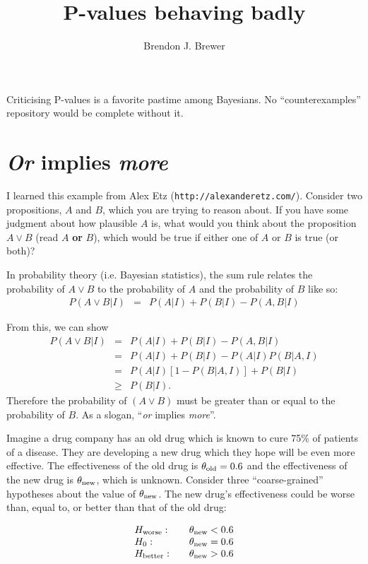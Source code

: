 \documentclass[a4paper, 12pt]{article}
\title{P-values behaving badly}
\author{Brendon J. Brewer}
\begin{document}
\maketitle

Criticising P-values is a favorite pastime among Bayesians. No
``counterexamples'' repository would be complete without it.

\section{{\em Or} implies {\em more}}
I learned this example from Alex Etz ({\tt http://alexanderetz.com/}).
Consider two propositions, $A$ and $B$, which you are trying to reason about.
If you have some judgment about how plausible $A$ is, what would you think
about the proposition $A \vee B$ (read $A$ {\bf or} $B$), which would be true
if either one of $A$ or $B$ is true (or both)? 

In probability theory (i.e. Bayesian statistics), the sum rule relates the
probability of $A \vee B$ to the probability of $A$ and the probability of
$B$ like so:
\begin{eqnarray}
P(A \vee B | I) &=& P(A | I) + P(B | I) - P(A, B | I)
\end{eqnarray}

From this, we can show
\begin{eqnarray}
P(A \vee B | I) &=& P(A | I) + P(B | I) - P(A, B | I)\\
                &=& P(A | I) + P(B | I) - P(A | I)P(B | A, I)\\
                &=& P(A | I)\left[1 - P(B | A,I)\right] + P(B | I)\\
                &\geq& P(B | I). 
\end{eqnarray}
Therefore the probability of $(A \vee B)$ must be greater than or equal to
the probability of $B$. As a slogan, ``{\em or} implies {\em more}''.

Imagine a drug company has an old drug which is known to cure
75\% of patients of a disease. They are developing a new drug
which they hope will be even more effective.
The effectiveness of the old drug is $\theta_{\rm old} = 0.6$ and the
effectiveness of the new drug is $\theta_{\rm new}$, which is unknown.
Consider three ``coarse-grained''
hypotheses about the value of $\theta_{\rm new}$. The new drug's
effectiveness could be worse than, equal to, or better than that of the old
drug:

\begin{equation}
\begin{array}{lcl}
H_{\rm worse}:  &  &\theta_{\rm new} < 0.6\\
H_0:            &  &\theta_{\rm new} = 0.6\\
H_{\rm better}: &  &\theta_{\rm new} > 0.6
\end{array}
\end{equation}
\end{document}
